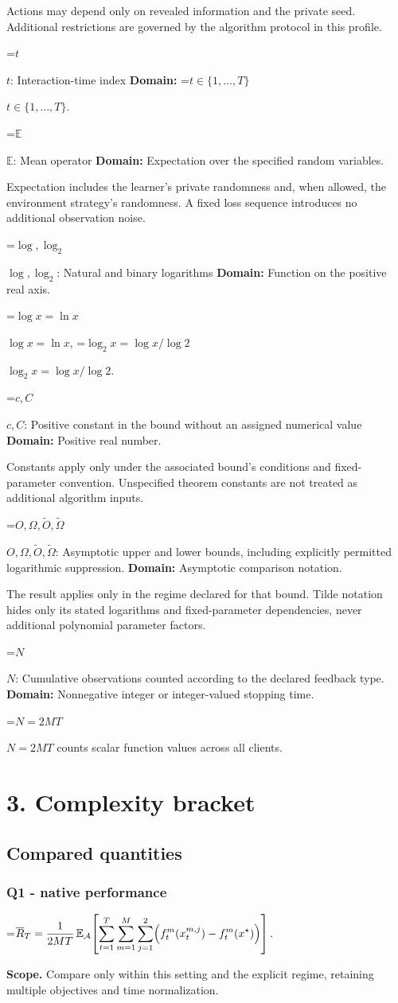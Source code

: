 \documentclass[10pt,a4paper]{article}
\newcommand{\AtlasMath}[1]{\par\begingroup\centering\setbox0=\hbox{$\displaystyle #1$}\ifdim\wd0>1.4\linewidth\typeout{ATLAS WIDE FORMULA: \the\wd0}\fi\ifdim\wd0>\linewidth\resizebox{\linewidth}{!}{\box0}\else\box0\fi\par\endgroup}
\newcommand{\AtlasInlineMath}[1]{\begingroup\setbox0=\hbox{$#1$}\ifdim\wd0>.4\linewidth\endgroup\AtlasMath{#1}\else\endgroup$#1$\fi}
\begin{document}
Actions may depend only on revealed information and the private seed. Additional restrictions are governed by the algorithm protocol in this profile.

\AtlasInlineMath{t}: Interaction-time index \textbf{Domain:} \AtlasInlineMath{t\in\{1,\ldots,T\}}.

\AtlasInlineMath{\mathbb E}: Mean operator \textbf{Domain:} Expectation over the specified random variables.

Expectation includes the learner's private randomness and, when allowed, the environment strategy's randomness. A fixed loss sequence introduces no additional observation noise.

\AtlasInlineMath{\log,\log_2}: Natural and binary logarithms \textbf{Domain:} Function on the positive real axis.

\AtlasInlineMath{\log x=\ln x}, \AtlasInlineMath{\log_2x=\log x/\log2}.

\AtlasInlineMath{c,C}: Positive constant in the bound without an assigned numerical value \textbf{Domain:} Positive real number.

Constants apply only under the associated bound’s conditions and fixed-parameter convention. Unspecified theorem constants are not treated as additional algorithm inputs.

\AtlasInlineMath{O,\Omega,\widetilde O,\widetilde\Omega}: Asymptotic upper and lower bounds, including explicitly permitted logarithmic suppression. \textbf{Domain:} Asymptotic comparison notation.

The result applies only in the regime declared for that bound. Tilde notation hides only its stated logarithms and fixed-parameter dependencies, never additional polynomial parameter factors.

\AtlasInlineMath{N}: Cumulative observations counted according to the declared feedback type. \textbf{Domain:} Nonnegative integer or integer-valued stopping time.

\AtlasInlineMath{N=2MT} counts scalar function values across all clients.

\section{3. Complexity bracket}
\subsection{Compared quantities}
\subsubsection{Q1 - native performance}
\AtlasMath{\overline R_T=\frac1{2MT}\,\mathbb E_{\mathcal A}\!\left[\sum_{t=1}^{T}\sum_{m=1}^{M}\sum_{j=1}^{2}\Bigl(f_t^m(x_t^{m,j})-f_t^m(x^\star)\Bigr)\right].}
\textbf{Scope.} Compare only within this setting and the explicit regime, retaining multiple objectives and time normalization.
\end{document}
